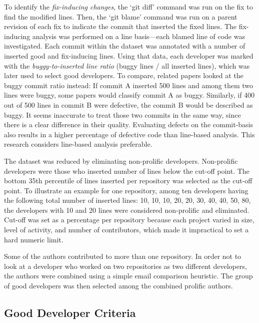 To identify the \textit{fix-inducing changes}, the ‘git diff’ command was run on the fix to find the modified lines. Then, the ‘git blame’ command was run on a parent revision of each fix to indicate the commit that inserted the fixed lines. The fix-inducing analysis was performed on a line basis—each blamed line of code was investigated. Each commit within the dataset was annotated with a number of inserted good and fix-inducing lines. Using that data, each developer was marked with the \textit{buggy-to-inserted line ratio} (buggy lines / all inserted lines), which was later used to select good developers. To compare, related papers looked at the buggy commit ratio instead:\parencite{Eyolfson} If commit A inserted 500 lines and among them two lines were buggy, some papers would classify commit A as buggy. Similarly, if 400 out of 500 lines in commit B were defective, the commit B would be described as buggy. It seems inaccurate to treat those two commits in the same way, since there is a clear difference in their quality. Evaluating defects on the commit-basis also results in a  higher percentage of defective code than line-based analysis. This research considers line-based analysis preferable. \par

The dataset was reduced by eliminating non-prolific developers. Non-prolific developers were those who inserted number of lines below the cut-off point. The bottom 35th percentile of lines inserted per repository was selected as the cut-off point. To illustrate an example for one repository, among ten developers having the following total number of inserted lines: 10, 10, 10, 20, 20, 30, 40, 40, 50, 80, the developers with 10 and 20 lines were considered non-prolific and eliminated. Cut-off was set as a percentage per repository because each project varied in size, level of activity, and number of contributors, which made it impractical to set a hard numeric limit. \par

Some of the authors contributed to more than one repository. In order not to look at a developer who worked on two repositories as two different developers, the authors were combined using a simple email comparison heuristic. The group of good developers was then selected among the combined prolific authors. \par

\subsection{Good Developer Criteria}

